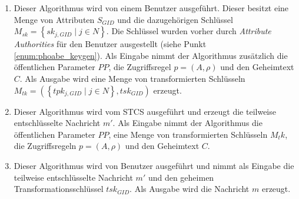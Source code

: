 \begin{enumerate}
	\item {} Dieser Algorithmus
		wird von einem Benutzer ausgeführt. Dieser besitzt eine Menge von
		Attributen $S_{GID}$ und die dazugehörigen Schlüssel $M_{sk} = \left\{
		sk_{j, GID} \;\vert\; j \in N \right\}$. Die Schlüssel wurden vorher durch
		\textit{Attribute Authorities} für den Benutzer ausgestellt (siehe Punkt
		\ref{enum:phoabe_keygen}). Als Eingabe nimmt der Algorithmus zusätzlich
		die öffentlichen Parameter $PP$, die Zugriffsregel $p = \left(A,
		\rho\right)$ und den Geheimtext $C$. Als Ausgabe wird eine Menge von
		transformierten Schlüsseln $M_{tk} = \left( \left\{tpk_{j, GID} \;\vert\;
		j \in N\right\}, tsk_{GID} \right)$ erzeugt.

	\item {} Dieser Algorithmus wird
		vom STCS ausgeführt und erzeugt die teilweise entschlüsselte Nachricht
		$m'$. Als Eingabe nimmt der Algorithmus die öffentlichen Parameter $PP$,
		eine Menge von transformierten Schlüsseln $M_tk$, die Zugriffsregeln $p =
		\left(A, \rho\right)$ und den Geheimtext $C$.

	\item {} Dieser Algorithmus wird von
		Benutzer ausgeführt und nimmt als Eingabe die teilweise entschlüsselte
		Nachricht $m'$ und den geheimen Transformationsschlüssel $tsk_{GID}$. Als
		Ausgabe wird die Nachricht $m$ erzeugt.
\end{enumerate}

